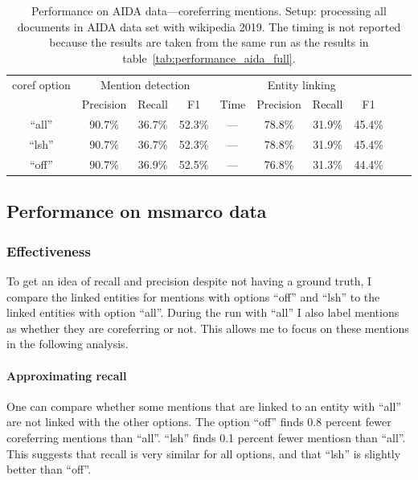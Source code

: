 \documentclass[a4paper,11pt]{article}
\numberwithin{equation}{section} %
\begin{document}
\begin{table}
 \begin{tabular}{c c c c c c c c c c}
\hline
 coref option & \multicolumn{3}{c}{Mention detection}  & \multicolumn{4}{c}{Entity linking}  \\
    \cmidrule(lr){2-4} \cmidrule(lr){5-8}
     & Precision & Recall & F1 & Time & Precision & Recall & F1 \\
 \hline 
 ``all'' & 90.7\% & 36.7\% & 52.3\% & --- & 78.8\% & 31.9\% & 45.4\% \\  
 ``lsh'' & 90.7\% & 36.7\% & 52.3\% & --- & 78.8\% & 31.9\% & 45.4\% \\
 ``off'' & 90.7\% & 36.9\% & 52.5\% & --- & 76.8\% & 31.3\% & 44.4\% \\ 
\hline 
\end{tabular}
\caption{Performance on AIDA data---coreferring mentions. Setup: processing all documents in AIDA data set with wikipedia 2019. The timing is not reported because the results are taken from the same run as the results in table~\ref{tab:performance_aida_full}.}
\label{tab:performance_aida_corefs}
\end{table}


\subsection{Performance on msmarco data}

\subsubsection{Effectiveness}

To get an idea of recall and precision despite not having a ground truth, I compare the linked entities for mentions with options ``off'' and ``lsh'' to the linked entities with option ``all''. 
During the run with ``all'' I also label mentions as whether they are coreferring or not. This allows me to focus on these mentions in the following analysis.


\paragraph{Approximating recall}
One can compare whether some mentions that are linked to an entity with ``all'' are not linked with the other options. 
The option ``off'' finds 0.8 percent fewer coreferring mentions than ``all''. ``lsh'' finds 0.1 percent fewer mentiosn than ``all''. 
This suggests that recall is very similar for all options, and that ``lsh'' is slightly better than ``off''. 
\end{document}
